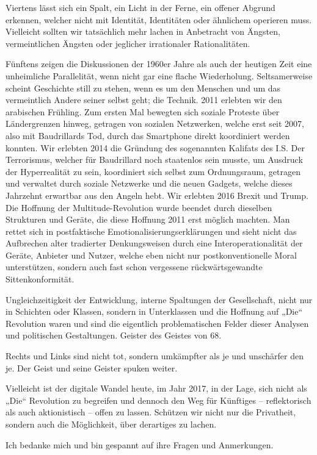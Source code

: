 \documentclass[a4paper,11pt]{article}
\begin{document}
Viertens lässt sich ein Spalt, ein Licht in der Ferne, ein offener Abgrund
erkennen, welcher nicht mit Identität, Identitäten oder ähnlichem operieren
muss. Vielleicht sollten wir tatsächlich mehr lachen in Anbetracht von
Ängsten, vermeintlichen Ängsten oder jeglicher irrationaler Rationalitäten.

Fünftens zeigen die Diskussionen der 1960er Jahre als auch der heutigen Zeit
eine unheimliche Parallelität, wenn nicht gar eine flache
Wiederholung. Seltsamerweise scheint Geschichte still zu stehen, wenn es um
den Menschen und um das vermeintlich Andere seiner selbst geht; die
Technik. 2011 erlebten wir den arabischen Frühling. Zum ersten Mal bewegten
sich soziale Proteste über Ländergrenzen hinweg, getragen von sozialen
Netzwerken, welche erst seit 2007, also mit Baudrillards Tod, durch das
Smartphone direkt koordiniert werden konnten. Wir erlebten 2014 die Gründung
des sogenannten Kalifats des I.S. Der Terrorismus, welcher für Baudrillard
noch staatenlos sein musste, um Ausdruck der Hyperrealität zu sein,
koordiniert sich selbst zum Ordnungsraum, getragen und verwaltet durch soziale
Netzwerke und die neuen Gadgets, welche dieses Jahrzehnt erwartbar aus den
Angeln hebt. Wir erlebten 2016 Brexit und Trump. Die Hoffnung der
Multitude-Revolution wurde beendet durch dieselben Strukturen und Geräte, die
diese Hoffnung 2011 erst möglich machten. Man rettet sich in postfaktische
Emotionalisierungserklärungen und sieht nicht das Aufbrechen alter tradierter
Denkungsweisen durch eine Interoperationalität der Geräte, Anbieter und
Nutzer, welche eben nicht nur postkonventionelle Moral unterstützen, sondern
auch fast schon vergessene rückwärtsgewandte Sittenkonformität.

Ungleichzeitigkeit der Entwicklung, interne Spaltungen der Gesellschaft, nicht
nur in Schichten oder Klassen, sondern in Unterklassen und die Hoffnung auf
„Die“ Revolution waren und sind die eigentlich problematischen Felder dieser
Analysen und politischen Gestaltungen. Geister des Geistes von 68.

Rechts und Links sind nicht tot, sondern umkämpfter als je und unschärfer den
je. Der Geist und seine Geister spuken weiter.

Vielleicht ist der digitale Wandel heute, im Jahr 2017, in der Lage, sich
nicht als „Die“ Revolution zu begreifen und dennoch den Weg für Künftiges –
reflektorisch als auch aktionistisch – offen zu lassen. Schützen wir nicht nur
die Privatheit, sondern auch die Möglichkeit, über derartiges zu lachen.

Ich bedanke mich und bin gespannt auf ihre Fragen und Anmerkungen.
\end{document}
